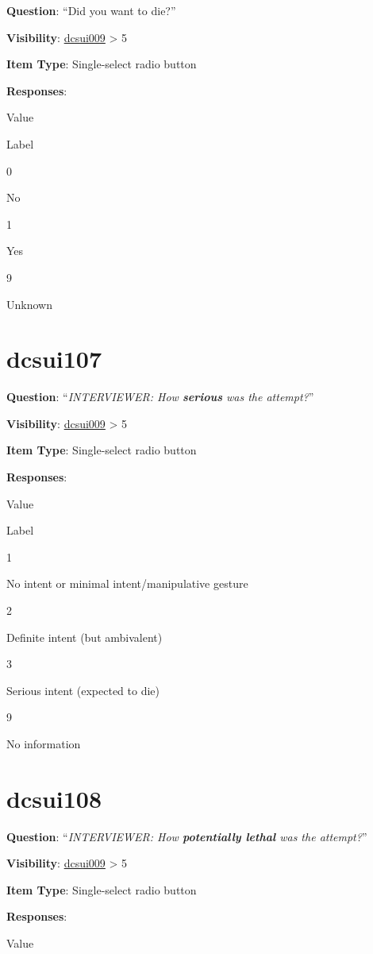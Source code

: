 \documentclass[]{book}
\begin{document}
\textbf{Question}: ``Did you want to die?''

\textbf{Visibility}: \protect\hyperlink{dcsui009}{dcsui009} \textgreater{} 5

\textbf{Item Type}: Single-select radio button

\textbf{Responses}:

Value

Label

0

No

1

Yes

9

Unknown

\hypertarget{dcsui107}{%
\section{dcsui107}\label{dcsui107}}

\textbf{Question}: ``\emph{INTERVIEWER: How \textbf{serious} was the attempt?}''

\textbf{Visibility}: \protect\hyperlink{dcsui009}{dcsui009} \textgreater{} 5

\textbf{Item Type}: Single-select radio button

\textbf{Responses}:

Value

Label

1

No intent or minimal intent/manipulative gesture

2

Definite intent (but ambivalent)

3

Serious intent (expected to die)

9

No information

\hypertarget{dcsui108}{%
\section{dcsui108}\label{dcsui108}}

\textbf{Question}: ``\emph{INTERVIEWER: How \textbf{potentially lethal} was the attempt?}''

\textbf{Visibility}: \protect\hyperlink{dcsui009}{dcsui009} \textgreater{} 5

\textbf{Item Type}: Single-select radio button

\textbf{Responses}:

Value
\end{document}
